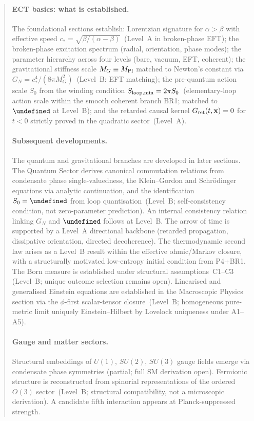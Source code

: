 \documentclass[11pt,a4paper]{article}
\let\hbar\undefined
\numberwithin{equation}{section}
\begin{document}
\begin{abstract}
\paragraph{ECT basics: what is established.}
The foundational sections establish:
Lorentzian signature for $\alpha>\beta$ with effective speed
$c_*=\sqrt{\beta/(\alpha-\beta)}$~(Level~A in broken-phase EFT);
the broken-phase excitation spectrum (radial, orientation, phase modes);
the parameter hierarchy across four levels (bare, vacuum, EFT, coherent);
the gravitational stiffness scale $M_G\equiv\bar M_{\rm Pl}$
matched to Newton's constant via $G_N=c_*^4/(8\pi M_G^2)$~(Level~B: EFT matching);
the pre-quantum action scale $S_0$ from the winding condition
$S_{\rm loop,min}=2\pi S_0$~(elementary-loop action scale within the smooth coherent branch BR1; matched to $\hbar$ at Level~B);
and the retarded causal kernel $G_{\rm ret}(t,\mathbf x)=0$ for $t<0$
strictly proved in the quadratic sector~(Level~A).

\paragraph{Subsequent developments.}
The quantum and gravitational branches are developed in later sections.
The Quantum Sector derives canonical commutation relations from condensate
phase single-valuedness, the Klein--Gordon and Schrödinger equations via
analytic continuation, and the identification $S_0=\hbar$ from loop
quantisation~(Level~B; self-consistency condition, not zero-parameter prediction).
An internal consistency relation linking $G_N$ and $\hbar$ follows at Level~B.
The arrow of time is supported by a Level~A directional backbone
(retarded propagation, dissipative orientation, directed decoherence).
The thermodynamic second law arises as a Level~B result within the
effective ohmic/Markov closure, with a structurally motivated
low-entropy initial condition from P4+BR1.
The Born measure is established under structural assumptions~C1--C3
(Level~B; unique outcome selection remains open).
Linearised and generalised Einstein equations are established in the
Macroscopic Physics section via the $\phi$-first scalar-tensor closure~(Level~B; homogeneous pure-metric limit uniquely Einstein--Hilbert by
Lovelock uniqueness under A1--A5).

\paragraph{Gauge and matter sectors.}
Structural embeddings of $U(1)$, $SU(2)$, $SU(3)$ gauge fields emerge
via condensate phase symmetries (partial; full SM derivation open).
Fermionic structure is reconstructed from spinorial representations
of the ordered $O(3)$ sector~(Level~B; structural compatibility,
not a microscopic derivation).
A candidate fifth interaction appears at Planck-suppressed strength.


\end{abstract}
\end{document}
